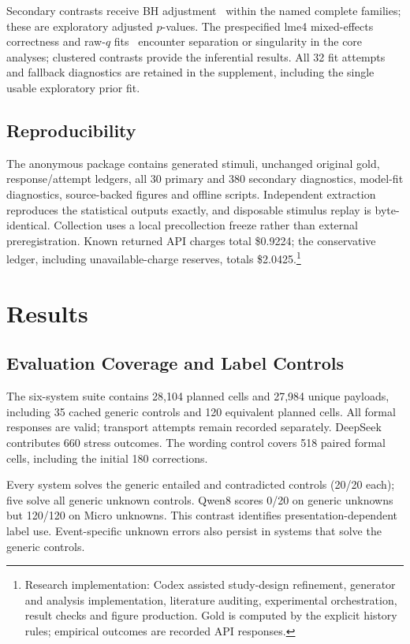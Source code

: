 \documentclass[sigconf,anonymous,review]{acmart}
\begin{document}
Secondary contrasts receive BH adjustment~\cite{bh1995} within the named complete families; these are exploratory adjusted $p$-values. The prespecified lme4 mixed-effects correctness and raw-$q$ fits~\cite{bates2015} encounter separation or singularity in the core analyses; clustered contrasts provide the inferential results. All 32 fit attempts and fallback diagnostics are retained in the supplement, including the single usable exploratory prior fit.

\subsection{Reproducibility}
The anonymous package contains generated stimuli, unchanged original gold, response/attempt ledgers, all 30 primary and 380 secondary diagnostics, model-fit diagnostics, source-backed figures and offline scripts. Independent extraction reproduces the statistical outputs exactly, and disposable stimulus replay is byte-identical. Collection uses a local precollection freeze rather than external preregistration. Known returned API charges total \$0.9224; the conservative ledger, including unavailable-charge reserves, totals \$2.0425.\footnote{Research implementation: Codex assisted study-design refinement, generator and analysis implementation, literature auditing, experimental orchestration, result checks and figure production. Gold is computed by the explicit history rules; empirical outcomes are recorded API responses.}

\section{Results}
\subsection{Evaluation Coverage and Label Controls}
The six-system suite contains 28,104 planned cells and 27,984 unique payloads, including 35 cached generic controls and 120 equivalent planned cells. All formal responses are valid; transport attempts remain recorded separately. DeepSeek contributes 660 stress outcomes. The wording control covers 518 paired formal cells, including the initial 180 corrections.

Every system solves the generic entailed and contradicted controls (20/20 each); five solve all generic unknown controls. Qwen8 scores 0/20 on generic unknowns but 120/120 on Micro unknowns. This contrast identifies presentation-dependent label use. Event-specific unknown errors also persist in systems that solve the generic controls.
\end{document}
